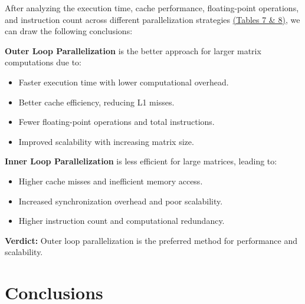\documentclass{article}
\begin{document}
After analyzing the execution time, cache performance, floating-point operations, and instruction count across different parallelization strategies \href{https://docs.google.com/document/d/1E8KPoQWMwUetj-bHXUUAothTzyv35YMWbAajiGcYC3A/edit?usp=sharing}{(Tables 7 \& 8)}, we can draw the following conclusions:


\textbf{Outer Loop Parallelization} is the better approach for larger matrix computations due to:

\begin{itemize}
    \item Faster execution time with lower computational overhead.
    \item Better cache efficiency, reducing L1 misses.
    \item Fewer floating-point operations and total instructions.
    \item Improved scalability with increasing matrix size.
\end{itemize}

\textbf{Inner Loop Parallelization} is less efficient for large matrices, leading to:

\begin{itemize}
    \item Higher cache misses and inefficient memory access.
    \item Increased synchronization overhead and poor scalability.
    \item Higher instruction count and computational redundancy.
\end{itemize}

\textbf{Verdict:} Outer loop parallelization is the preferred method for performance and scalability.

\section{Conclusions}
\end{document}
